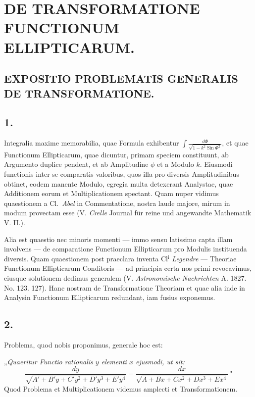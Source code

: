 \documentclass{article}
\begin{document}
\section*{DE TRANSFORMATIONE FUNCTIONUM ELLIPTICARUM.}

\subsection*{EXPOSITIO PROBLEMATIS GENERALIS DE TRANSFORMATIONE.}

\subsection*{1.}

Integralia maxime memorabilia, quae Formula exhibentur $\displaystyle\int\frac{d\Phi}{\sqrt{1-k^{2}\operatorname{Sin}\Phi^{2}}}$, et quae Functionum Ellipticarum, quae dicuntur, primam speciem constituunt, ab Argumento duplice pendent, et ab Amplitudine $\phi$ et a Modulo $k$. Eiusmodi functionis inter se comparatis valoribus, quos illa pro diversis Amplitudinibus obtinet, eodem manente Modulo, egregia multa detexerant Analystae, quae Additionem eorum et Multiplicationem spectant. Quam nuper vidimus quaestionem a Cl.\ \emph{Abel} in Commentatione, nostra laude majore, mirum in modum provectam esse (V. \emph{Crelle} Journal für reine und angewandte Mathematik V. II.).

Alia est quaestio nec minoris momenti --- immo sensu latissimo capta illam involvens --- de comparatione Functionum Ellipticarum pro Modulis instituenda diversis. Quam quaestionem post praeclara inventa Cl$^{\mathrm{i}}$ \emph{Legendre} --- Theoriae Functionum Ellipticarum Conditoris --- ad principia certa nos primi revocavimus, eiusque solutionem dedimus generalem (V. \emph{Astronomische Nachrichten} A. 1827. No. 123. 127). Hanc nostram de Transformatione Theoriam et quae alia inde in Analysin Functionum Ellipticarum redundant, iam fusius exponemus.


\subsection*{2.}

Problema, quod nobis proponimus, generale hoc est:

„\emph{Quaeritur Functio rationalis $y$ elementi $x$ ejusmodi, ut sit:}
\[
\frac{dy}{\sqrt{A'+B'y+C'y^{2}+D'y^{3}+E'y^{4}}}=\frac{dx}{\sqrt{A+Bx+Cx^{2}+Dx^{3}+Ex^{4}}}\ \text{"}
\]
Quod Problema et Multiplicationem videmus amplecti et Transformationem.
\end{document}
